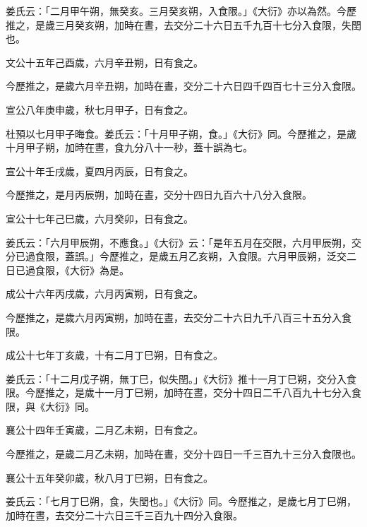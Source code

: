 \begin{pinyinscope}
 姜氏云：「二月甲午朔，無癸亥。三月癸亥朔，入食限。」《大衍》亦以為然。今歷推之，是歲三月癸亥朔，加時在晝，去交分二十六日五千九百十七分入食限，失閏也。



 文公十五年己酉歲，六月辛丑朔，日有食之。



 今歷推之，是歲六月辛丑朔，加時在晝，交分二十六日四千四百七十三分入食限。



 宣公八年庚申歲，秋七月甲子，日有食之。



 杜預以七月甲子晦食。姜氏云：「十月甲子朔，食。」《大衍》同。今歷推之，是歲十月甲子朔，加時在晝，食九分八十一秒，蓋十誤為七。



 宣公十年壬戌歲，夏四月丙辰，日有食之。



 今歷推之，是月丙辰朔，加時在晝，交分十四日九百六十八分入食限。



 宣公十七年己巳歲，六月癸卯，日有食之。



 姜氏云：「六月甲辰朔，不應食。」《大衍》云：「是年五月在交限，六月甲辰朔，交分已過食限，蓋誤。」今歷推之，是歲五月乙亥朔，入食限。六月甲辰朔，泛交二日已過食限，《大衍》為是。



 成公十六年丙戌歲，六月丙寅朔，日有食之。



 今歷推之，是歲六月丙寅朔，加時在晝，去交分二十六日九千八百三十五分入食限。



 成公十七年丁亥歲，十有二月丁巳朔，日有食之。



 姜氏云：「十二月戊子朔，無丁巳，似失閏。」《大衍》推十一月丁巳朔，交分入食限。今歷推之，是歲十一月丁巳朔，加時在晝，交分十四日二千八百九十七分入食限，與《大衍》同。



 襄公十四年壬寅歲，二月乙未朔，日有食之。



 今歷推之，是歲二月乙未朔，加時在晝，交分十四日一千三百九十三分入食限也。



 襄公十五年癸卯歲，秋八月丁巳朔，日有食之。



 姜氏云：「七月丁巳朔，食，失閏也。」《大衍》同。今歷推之，是歲七月丁巳朔，加時在晝，去交分二十六日三千三百九十四分入食限。




\end{pinyinscope}
